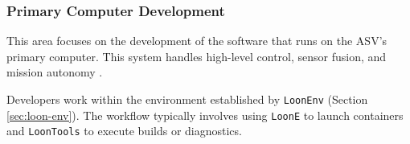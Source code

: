 
\subsubsection{Primary Computer Development}
This area focuses on the development of the software that runs on the ASV's primary computer. This system handles high-level control, sensor fusion, and mission autonomy \autocite{LOONENV}.

Developers work within the environment established by \texttt{LoonEnv} (Section \ref{sec:loon-env}). The workflow typically involves using \texttt{LoonE} to launch containers and \texttt{LoonTools} to execute builds or diagnostics.
